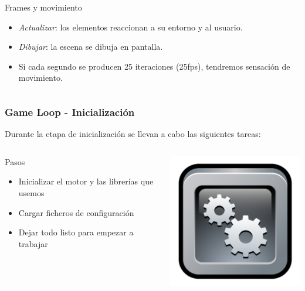 \documentclass{beamer}
\begin{document}
\begin{frame}
\begin{columns}
	\column{150pt}
	\begin{alertblock}{Frames y movimiento}
		\begin{itemize}
			\item \emph{Actualizar}: los elementos reaccionan a su entorno y al usuario.
			\item \emph{Dibujar}: la escena se dibuja en pantalla.
			\item Si cada segundo se producen 25 iteraciones (25fps), tendremos sensación de movimiento.
		\end{itemize}            
	\end{alertblock}
	
	\end{columns}
\end{frame}

\begin{frame}
	\frametitle{Game Loop - Inicialización}
	
	Durante la etapa de inicialización se llevan a cabo las siguientes
	tareas:
	
	\begin{columns}[c]
	\column{200pt}
		
	\begin{block}{Pasos}
		\begin{itemize}
			\item Inicializar el motor y las librerías que usemos
			\item Cargar ficheros de configuración
			\item Dejar todo listo para empezar a trabajar
		\end{itemize}            
	\end{block}
	
	\column{100pt}
	
	\begin{center}
		\includegraphics[scale=0.25]{img/engine.png}
	\end{center}	
	
	\end{columns}
	
\end{frame}
\end{document}

